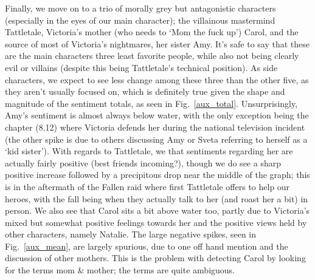 \documentclass[11pt]{article}
\begin{document}
\noindent
Finally, we move on to a trio of morally grey but antagonistic characters (especially in the eyes of our main character); the villainous mastermind Tattletale, Victoria's mother (who needs to `Mom the fuck up') Carol, and the source of most of Victoria's nightmares, her sister Amy. It's safe to say that these are the main characters three least favorite people, while also not being clearly evil or villains (despite this being Tattletale's technical position).  As side characters, we expect to see less change among these three than the other five, as they aren't usually focused on, which is definitely true given the shape and magnitude of the sentiment totals, as seen in Fig.~\ref{aux_total}. Unsurprisingly, Amy's sentiment is almost always below water, with the only exception being the chapter (8.12) where Victoria defends her during the national television incident (the other spike is due to others discussing Amy or Sveta referring to herself as a `kid sister'). With regards to Tattletale, we that sentiments regarding her are actually fairly positive (best friends incoming?), though we do see a sharp positive increase followed by a precipitous drop near the middle of the graph; this is in the aftermath of the Fallen raid where first Tattletale offers to help our heroes, with the fall being when they actually talk to her (and roast her a bit) in person. We also see that Carol sits a bit above water too, partly due to Victoria's mixed but somewhat positive feelings towards her and the positive views held by other characters, namely Natalie. The large negative spikes, seen in Fig.~\ref{aux_mean}, are largely spurious, due to one off hand mention and the discussion of other mothers. This is the problem with detecting Carol by looking for the terms mom \& mother; the terms are quite ambiguous. 
\end{document}
